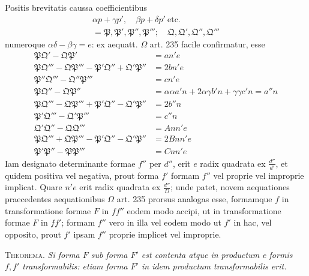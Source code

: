 Positis brevitatis caussa coefficientibus
\[
\begin{gathered}\alpha p+\gamma p',\quad\beta p+\delta p'\ \text{etc.}\\=\mathfrak{P},\mathfrak{P}',\mathfrak{P}'',\mathfrak{P}''';\quad\mathfrak{Q},\mathfrak{Q}',\mathfrak{Q}'',\mathfrak{Q}'''\end{gathered}
\]
numeroque $\alpha\delta-\beta\gamma=e$: ex aequatt. $\Omega$ art. 235 facile confirmatur, esse
\[
\begin{aligned}
\mathfrak{P}\mathfrak{Q}'-\mathfrak{Q}\mathfrak{P}'&=an'e\\
\mathfrak{P}\mathfrak{Q}'''-\mathfrak{Q}\mathfrak{P}'''-\mathfrak{P}'\mathfrak{Q}''+\mathfrak{Q}'\mathfrak{P}''&=2bn'e\\
\mathfrak{P}''\mathfrak{Q}'''-\mathfrak{Q}''\mathfrak{P}'''&=cn'e\\
\mathfrak{P}\mathfrak{Q}''-\mathfrak{Q}\mathfrak{P}''&=\alpha\alpha a'n+2\alpha\gamma b'n+\gamma\gamma c'n=a''n\\
\mathfrak{P}\mathfrak{Q}'''-\mathfrak{Q}\mathfrak{P}'''+\mathfrak{P}'\mathfrak{Q}''-\mathfrak{Q}'\mathfrak{P}''&=2b''n\\
\mathfrak{P}'\mathfrak{Q}'''-\mathfrak{Q}'\mathfrak{P}'''&=c''n\\
\mathfrak{Q}'\mathfrak{Q}''-\mathfrak{Q}\mathfrak{Q}'''&=Ann'e\\
\mathfrak{P}\mathfrak{Q}'''+\mathfrak{Q}\mathfrak{P}'''-\mathfrak{P}'\mathfrak{Q}''-\mathfrak{Q}'\mathfrak{P}''&=2Bnn'e\\
\mathfrak{P}'\mathfrak{P}''-\mathfrak{P}\mathfrak{P}'''&=Cnn'e
\end{aligned}
\]
Iam designato determinante formae $f''$ per $d''$, erit $e$ radix quadrata ex $\frac{d''}{d'}$, et quidem positiva vel negativa, prout forma $f'$ formam $f''$ vel proprie vel improprie implicat. Quare $n'e$ erit radix quadrata ex $\frac{d''}{D}$; unde patet, novem aequationes praecedentes aequationibus $\Omega$ art. 235 prorsus analogas esse, formamque $f$ in transformatione formae $F$ in $ff''$ eodem modo accipi, ut in transformatione formae $F$ in $ff'$; formam $f''$ vero in illa vel eodem modo ut $f'$ in hac, vel opposito, prout $f'$ ipsam $f''$ proprie implicet vel improprie.

\textsc{Theorema.} \textit{Si forma $F$ sub forma $F'$ est contenta atque in productum e formis $f,f'$ transformabilis: etiam forma $F'$ in idem productum transformabilis erit.}

